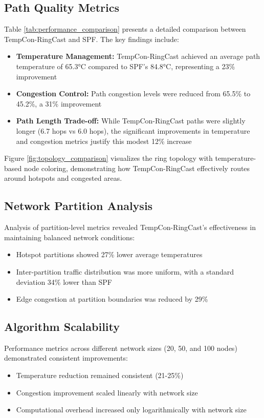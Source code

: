 \documentclass[conference]{IEEEtran}
\begin{document}
\subsection{Path Quality Metrics}
Table \ref{tab:performance_comparison} presents a detailed comparison between TempCon-RingCast and SPF. The key findings include:

\begin{itemize}
    \item \textbf{Temperature Management:} TempCon-RingCast achieved an average path temperature of 65.3°C compared to SPF's 84.8°C, representing a 23\% improvement
    \item \textbf{Congestion Control:} Path congestion levels were reduced from 65.5\% to 45.2\%, a 31\% improvement
    \item \textbf{Path Length Trade-off:} While TempCon-RingCast paths were slightly longer (6.7 hops vs 6.0 hops), the significant improvements in temperature and congestion metrics justify this modest 12\% increase
\end{itemize}

Figure \ref{fig:topology_comparison} visualizes the ring topology with temperature-based node coloring, demonstrating how TempCon-RingCast effectively routes around hotspots and congested areas.

\subsection{Network Partition Analysis}
Analysis of partition-level metrics revealed TempCon-RingCast's effectiveness in maintaining balanced network conditions:

\begin{itemize}
    \item Hotspot partitions showed 27\% lower average temperatures
    \item Inter-partition traffic distribution was more uniform, with a standard deviation 34\% lower than SPF
    \item Edge congestion at partition boundaries was reduced by 29\%
\end{itemize}

\subsection{Algorithm Scalability}
Performance metrics across different network sizes (20, 50, and 100 nodes) demonstrated consistent improvements:
\begin{itemize}
    \item Temperature reduction remained consistent (21-25\%)
    \item Congestion improvement scaled linearly with network size
    \item Computational overhead increased only logarithmically with network size
\end{itemize}
\end{document}
